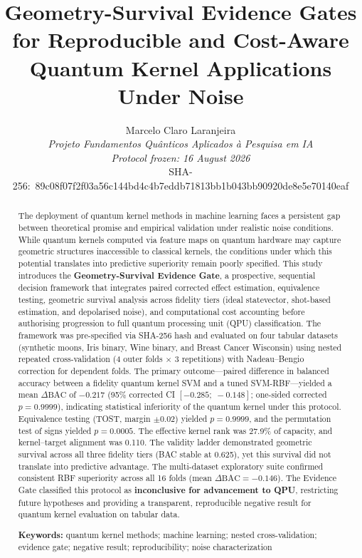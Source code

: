 \documentclass[11pt,a4paper]{article}
\title{Geometry-Survival Evidence Gates for Reproducible and Cost-Aware
       Quantum Kernel Applications Under Noise}
\author{Marcelo Claro Laranjeira\\[4pt]
        \textit{Projeto Fundamentos Qu\^anticos Aplicados \`a Pesquisa em IA}\\[2pt]
        \textit{Protocol frozen: 16 August 2026}\\[2pt]
        SHA-256:\ 89c08f07f2f03a56c144bd4c4b7eddb71813bb1b043bb90920de8e5e70140eaf}
\date{}
\newcommand{\BAC}{\mathrm{BAC}}
\begin{document}
\maketitle

\begin{abstract}
The deployment of quantum kernel methods in machine learning faces a persistent
gap between theoretical promise and empirical validation under realistic noise
conditions. While quantum kernels computed via feature maps on quantum hardware
may capture geometric structures inaccessible to classical kernels, the
conditions under which this potential translates into predictive superiority
remain poorly specified. This study introduces the
\textbf{Geometry-Survival Evidence Gate}, a prospective, sequential decision
framework that integrates paired corrected effect estimation, equivalence
testing, geometric survival analysis across fidelity tiers (ideal statevector,
shot-based estimation, and depolarised noise), and computational cost
accounting before authorising progression to full quantum processing unit (QPU)
classification. The framework was pre-specified via SHA-256 hash and evaluated
on four tabular datasets (synthetic moons, Iris binary, Wine binary, and Breast
Cancer Wisconsin) using nested repeated cross-validation (4 outer folds
$\times$ 3 repetitions) with Nadeau--Bengio correction for dependent folds. The
primary outcome---paired difference in balanced accuracy between a fidelity
quantum kernel SVM and a tuned SVM-RBF---yielded a mean $\Delta\BAC$ of
$-0.217$ (95\% corrected CI $[-0.285;\; -0.148]$; one-sided corrected
$p=0.9999$), indicating statistical inferiority of the quantum kernel under
this protocol. Equivalence testing (TOST, margin $\pm 0.02$) yielded
$p=0.9999$, and the permutation test of signs yielded $p=0.0005$. The
effective kernel rank was 27.9\% of capacity, and kernel--target alignment was
0.110. The validity ladder demonstrated geometric survival across all three
fidelity tiers (BAC stable at 0.625), yet this survival did not translate into
predictive advantage. The multi-dataset exploratory suite confirmed consistent
RBF superiority across all 16 folds (mean $\Delta\BAC = -0.146$). The Evidence
Gate classified this protocol as \textbf{inconclusive for advancement to QPU},
restricting future hypotheses and providing a transparent, reproducible negative
result for quantum kernel evaluation on tabular data.

\medskip
\noindent\textbf{Keywords:} quantum kernel methods; machine learning; nested
cross-validation; evidence gate; negative result; reproducibility; noise
characterization
\end{abstract}
\end{document}
